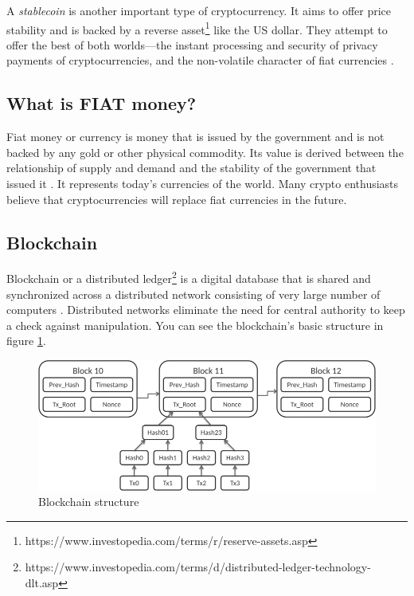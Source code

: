 \label{stablecoins-ref}
A \emph{stablecoin} is another important type of cryptocurrency. It aims to offer price stability and is backed by a reverse asset\footnote{https://www.investopedia.com/terms/r/reserve-assets.asp} like the US dollar. They attempt to offer the best of both worlds---the instant processing and security of privacy payments of cryptocurrencies, and the non-volatile character of fiat currencies \cite{investopedia-stablecoin}.

\subsection*{What is FIAT money?}
﻿Fiat money or currency is money that is issued by the government and is not backed by any gold or other physical commodity. Its value is derived between the relationship of supply and demand and the stability of the government that issued it \cite{investopedia-fiat}. It represents today's currencies of the world. Many crypto enthusiasts believe that cryptocurrencies will replace fiat currencies in the future.

\subsection*{Blockchain}
\label{blockchain}
Blockchain or a distributed ledger\footnote{https://www.investopedia.com/terms/d/distributed-ledger-technology-dlt.asp} is a digital database that is shared and synchronized across a distributed network consisting of very large number of computers \cite{investopedia-blockchain}. Distributed networks eliminate the need for central authority to keep a check against manipulation. You can see the blockchain's basic structure in figure \ref{blockchain-figure}.

\begin{figure}[h!]
    \label{blockchain-figure}
    \centering
    \includegraphics[width=\columnwidth]{figures/Bitcoin_Block_Data.png}
    \caption{Blockchain structure}
\end{figure}


